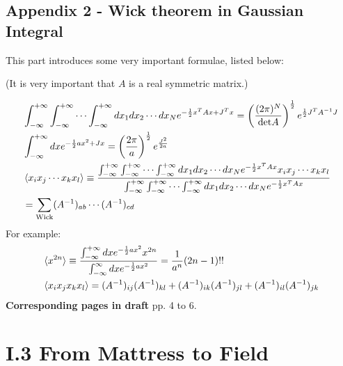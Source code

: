 \documentclass{book}
\numberwithin{equation}{subsection} %
\theoremstyle{definition}
\begin{document}
    \subsection{Appendix 2 - Wick theorem in Gaussian 
    Integral}

    This part introduces some very important formulae, listed 
    below:

    (It is very important that $A$ is a real symmetric matrix.)
    
    \begin{align}
        &\int_{-\infty}^{+\infty} \int_{-\infty}^{+\infty} \cdots
        \int_{-\infty}^{+\infty} dx_1 dx_2 \cdots dx_N
            e^{-\frac{1}{2} x^T A x + J^T x} =
            \left( \frac{(2\pi)^N}{\text{det}A} \right)^{\frac{1}{2}}
            e^{\frac{1}{2}J^T A^{-1}J}
   		\label{eq:QFT_in_a_Nutshell_Part_I.2.appdx1.1}
		\\
        &\int_{-\infty}^{+\infty} dx
        e^{-\frac{1}{2}ax^2+Jx} =
        \left(\frac{2\pi}{a}\right)^{\frac{1}{2}}
        e^{\frac{J^2}{2a}} 
        \\
        &\braket{x_i x_j \cdots x_k x_l}
        \equiv
            \frac{
                \int_{-\infty}^{+\infty}\int_{-\infty}^{+\infty}\cdots
                \int_{-\infty}^{+\infty} dx_1 dx_2\cdots dx_N
                e^{-\frac{1}{2}x^T Ax} x_i x_j \cdots x_k x_l}
                {
                \int_{-\infty}^{+\infty}\int_{-\infty}^{+\infty}\cdots
                \int_{-\infty}^{+\infty} dx_1 dx_2\cdots dx_N
                e^{-\frac{1}{2}x^T Ax} }
            \nonumber \\
        &= \sum_{\text{Wick}} 
            (A^{-1})_{ab}\cdots(A^{-1})_{cd}
    \end{align}
    For example:
    \begin{align*}
        &\braket{x^{2n}} \equiv 
            \frac{\int_{-\infty}^{+\infty}dx
            e^{-\frac{1}{2}ax^2} x^{2n}}
            {\int_{-\infty}^{\infty} dx e^{-\frac{1}{2}ax^2}
            }
        = \frac{1}{a^n}(2n-1)!! \\
        &\braket{x_ix_jx_kx_l} = 
        (A^{-1})_{ij}(A^{-1})_{kl}+(A^{-1})_{ik}(A^{-1})_{jl}
        +(A^{-1})_{il}(A^{-1})_{jk}
    \end{align*}
    \textbf{Corresponding pages in draft} pp. 4 to 6.
    
\section{I.3 From Mattress to Field}
\label{sec:QFT_in_a_Nutshell_Part_I.3}
\end{document}
